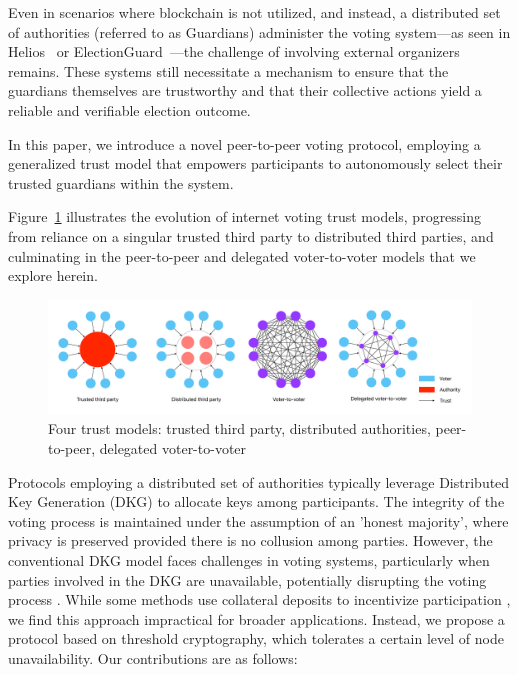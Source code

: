 \documentclass[runningheads]{llncs}
\begin{document}
Even in scenarios where blockchain is not utilized, and instead, a distributed set of authorities (referred to as Guardians) administer the voting system—as seen in Helios~\cite{adidaHeliosWebbasedOpenAudit2008} or ElectionGuard~\cite{ElectionGuard}—the challenge of involving external organizers remains. These systems still necessitate a mechanism to ensure that the guardians themselves are trustworthy and that their collective actions yield a reliable and verifiable election outcome.

In this paper, we introduce a novel peer-to-peer voting protocol, employing a generalized trust model that empowers participants to autonomously select their trusted guardians within the system. 

Figure~\ref{fig:trust-models} illustrates the evolution of internet voting trust models, progressing from reliance on a singular trusted third party to distributed third parties, and culminating in the peer-to-peer and delegated voter-to-voter models that we explore herein.

\begin{figure}
    \centering
    \includegraphics[width=\textwidth]{trust-models-voting.pdf}
    \caption{Four trust models: trusted third party, distributed authorities, peer-to-peer, delegated voter-to-voter}
    \label{fig:trust-models}
\end{figure}

Protocols employing a distributed set of authorities typically leverage Distributed Key Generation (DKG) \cite{gennaroSecureDistributedKey1999} to allocate keys among participants. The integrity of the voting process is maintained under the assumption of an 'honest majority', where privacy is preserved provided there is no collusion among parties. However, the conventional DKG model faces challenges in voting systems, particularly when parties involved in the DKG are unavailable, potentially disrupting the voting process \cite{haoAnonymousVotingTworound2010}. While some methods use collateral deposits to incentivize participation \cite{elsheikhDisputefreeScalableOpen2022}, we find this approach impractical for broader applications. Instead, we propose a protocol based on threshold cryptography, which tolerates a certain level of node unavailability. Our contributions are as follows:
\end{document}
